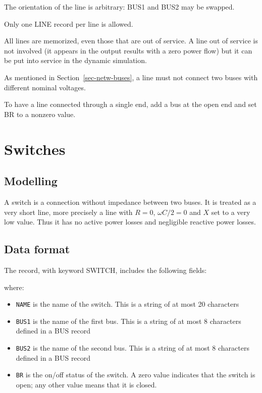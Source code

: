 The orientation of the line is arbitrary: BUS1 and BUS2 may be swapped.

Only one LINE record per line is allowed.

All lines are memorized, even those that are out of service. A line out of service is not involved (it appears in the output results with a zero power flow) but it can be put into service in the dynamic simulation.

As mentioned in Section~\ref{sec-netw-buses}, a line must not connect two buses with different nominal voltages.

To have a line connected through a single end, add a bus at the open end and set BR to a nonzero value.

\section{Switches}\label{sec-netw-switch}

\subsection{Modelling}

A switch is a connection without impedance between two buses. It is treated as a very short line, more precisely a line with $R=0$, ${\omega}C/2 = 0$ and $X$ set to a very low value. Thus it has no active power losses and negligible reactive power losses.

\subsection{Data format}

The record, with keyword SWITCH, includes the following fields:

\hspace*{5ex}{\tt SWITCH NAME BUS1 BUS2 BR ;}

where:
\begin{itemize}
\item {\tt NAME} is the name of the switch.  This is a string of at most 20 characters
\item {\tt BUS1} is the name of the first bus. This is a string of at most 8 characters defined in a BUS record
\item {\tt BUS2} is the name of the second bus. This is a string of at most 8 characters defined in a BUS record
\item {\tt BR} is the on/off status of the switch. A zero value indicates that the switch
is open; any other value means that it is closed.
\end{itemize}

